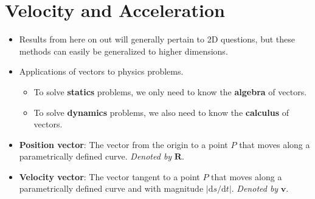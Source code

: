 \documentclass[../main.tex]{subfiles}
\begin{document}
\section{Velocity and Acceleration}
\begin{itemize}
    \item Results from here on out will generally pertain to 2D questions, but these methods can easily be generalized to higher dimensions.
    \item Applications of vectors to physics problems.
    \begin{itemize}
        \item To solve \textbf{statics} problems, we only need to know the \textbf{algebra} of vectors.
        \item To solve \textbf{dynamics} problems, we also need to know the \textbf{calculus} of vectors.
    \end{itemize}
    \item \textbf{Position vector}: The vector from the origin to a point $P$ that moves along a parametrically defined curve. \emph{Denoted by} $\textbf{R}$.
    \item \textbf{Velocity vector}: The vector tangent to a point $P$ that moves along a parametrically defined curve and with magnitude $|\text{d}s/\text{d}t|$. \emph{Denoted by} $\textbf{v}$.
    \begin{figure}[H]
        \centering
\end{figure}
\end{itemize}
\end{document}
